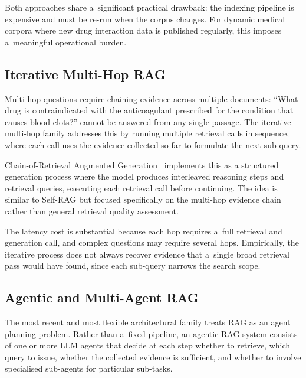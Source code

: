 Both approaches share a~significant practical drawback: the indexing pipeline is
expensive and must be re-run when the corpus changes.
For dynamic medical corpora where new drug interaction data is published regularly,
this imposes a~meaningful operational burden.

\subsection{Iterative Multi-Hop RAG}
\label{subsec:multihop}

Multi-hop questions require chaining evidence across multiple documents: ``What drug
is contraindicated with the anticoagulant prescribed for the condition that causes
blood clots?'' cannot be answered from any single passage.
The iterative multi-hop family addresses this by running multiple retrieval calls in
sequence, where each call uses the evidence collected so far to formulate the next
sub-query.

Chain-of-Retrieval Augmented Generation~\cite{wang2025chain} implements this as a
structured generation process where the model produces interleaved reasoning steps
and retrieval queries, executing each retrieval call before continuing.
The idea is similar to Self-RAG but focused specifically on the multi-hop evidence
chain rather than general retrieval quality assessment.

The latency cost is substantial because each hop requires a~full retrieval and
generation call, and complex questions may require several hops.
Empirically, the iterative process does not always recover evidence that a~single
broad retrieval pass would have found, since each sub-query narrows the search scope.

\subsection{Agentic and Multi-Agent RAG}
\label{subsec:agentic_rag}

The most recent and most flexible architectural family treats RAG as an agent
planning problem.
Rather than a~fixed pipeline, an agentic RAG system consists of one or more LLM
agents that decide at each step whether to retrieve, which query to issue, whether
the collected evidence is sufficient, and whether to involve specialised sub-agents
for particular sub-tasks.

